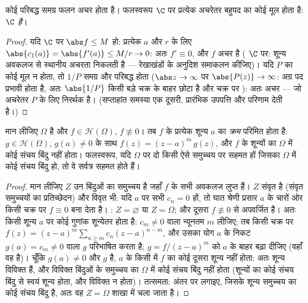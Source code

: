 \begin{corollary}[ल्यूविल; दालांबेर--गाउस]
\label{cor:b3:holomorphic:liouville}
कोई परिबद्ध समग्र फलन अचर होता है। फलस्वरूप $\C$ पर प्रत्येक
अचरेतर बहुपद का कोई मूल होता है: \emph{$\C$ 
है}।
\end{corollary}

\begin{proof}
यदि $\C$ पर $\abs f \leq M$ हो: प्रत्येक $a$ और $r$ के लिए $\abs{c_1(a)}
= \abs{f'(a)} \leq M/r \to 0$:
अतः $f' \equiv 0$, और $f$ अचर है ( $\C$ पर: शून्य अवकलज से
स्थानीय अचरता निकलती है --- रेखाखंडों के अनुदिश समाकलन कीजिए)।
यदि $P$ का कोई मूल न होता, तो $1/P$ समग्र और परिबद्ध होता
($\abs z \to \infty$ पर $\abs{P(z)} \to
\infty$: अग्र पद प्रभावी होता है, अतः $\abs{1/P}$ किसी बड़े
चक्र के बाहर छोटा है और  चक्र पर ): अतः अचर --- जो
अचरेतर $P$ के लिए निरर्थक है। (सप्ताहांत समस्या एक दूसरी,
प्रारंभिक उपपत्ति और  परिणाम देती है।)
\end{proof}

\begin{theorem}[शून्य विविक्त होते हैं; तत्समता प्रमेय]
\label{thm:b3:holomorphic:identity}
मान लीजिए $\Omega$ \emph{} है और $f \in \mathcal
H(\Omega)$, $f \not\equiv 0$। तब $f$ के
प्रत्येक शून्य $a$ का \emph{क्रम} परिमित होता है: $g \in
\mathcal H(\Omega)$, $g(a) \neq 0$
के साथ $f(z) = (z - a)^m\,g(z)$, और $f$ के शून्यों का $\Omega$ में कोई संचय बिंदु
नहीं होता। फलस्वरूप, यदि $\Omega$ पर दो  किसी ऐसे
समुच्चय पर सहमत हों जिसका $\Omega$ में कोई संचय बिंदु हो, तो वे
सर्वत्र सहमत होते हैं।
\end{theorem}

\begin{proof}
मान लीजिए $Z$ उन बिंदुओं का समुच्चय है जहाँ $f$ के सभी अवकलज
लुप्त हैं। $Z$ संवृत है (संवृत समुच्चयों का प्रतिच्छेदन) और
विवृत भी: यदि $a$ पर सभी $c_n = 0$ हों, तो घात श्रेणी प्रसार $a$
के चारों ओर किसी चक्र पर $f
\equiv 0$ बना देता है। : $Z =
\varnothing$ या
$Z = \Omega$; और दूसरा $f
\not\equiv 0$ से अपवर्जित है। अतः किसी शून्य $a$ पर कोई
गुणांक शून्येतर होता है: $c_m \neq 0$ वाला न्यूनतम $m$ लीजिए; तब किसी
चक्र पर $f(z) = (z -
a)^m\sum_{n\geq m}c_n(z-a)^{n-m}$, और उसका योग $a$ के निकट $g(a) = c_m \neq 0$ वाला 
$g$ परिभाषित करता है; $g = f/(z-a)^m$ को $a$ के बाहर बढ़ा दीजिए (वहाँ
वह  है)। चूँकि $g(a) \neq 0$ और $g$  है, $a$ के किसी
 में $f$ का कोई दूसरा शून्य नहीं होता: अतः शून्य विविक्त
हैं, और विविक्त बिंदुओं के समुच्चय का $\Omega$ में कोई संचय बिंदु
नहीं होता (शून्यों का कोई संचय बिंदु  से स्वयं शून्य होता,
और विविक्त न होता)। तत्समता: अंतर पर लगाइए, जिसके शून्य समुच्चय
का कोई संचय बिंदु है, अतः वह $Z = \Omega$ शाखा में चला जाता है।
\end{proof}

